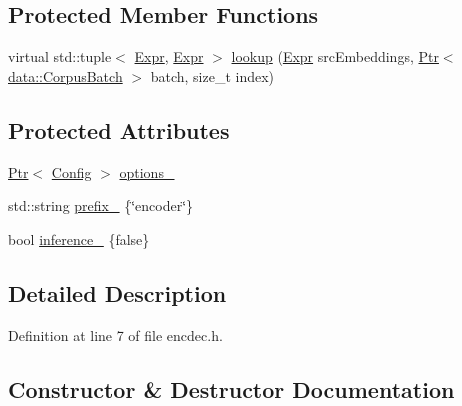 \subsection*{Protected Member Functions}
\begin{DoxyCompactItemize}
\item 
virtual std\+::tuple$<$ \hyperlink{namespacemarian_a498d8baf75b754011078b890b39c8e12}{Expr}, \hyperlink{namespacemarian_a498d8baf75b754011078b890b39c8e12}{Expr} $>$ \hyperlink{classmarian_1_1EncoderBase_a02e1594dfe8b093081c24f1aea1a35d6}{lookup} (\hyperlink{namespacemarian_a498d8baf75b754011078b890b39c8e12}{Expr} src\+Embeddings, \hyperlink{namespacemarian_ad1a373be43a00ef9ce35666145137b08}{Ptr}$<$ \hyperlink{classmarian_1_1data_1_1CorpusBatch}{data\+::\+Corpus\+Batch} $>$ batch, size\+\_\+t index)
\end{DoxyCompactItemize}
\subsection*{Protected Attributes}
\begin{DoxyCompactItemize}
\item 
\hyperlink{namespacemarian_ad1a373be43a00ef9ce35666145137b08}{Ptr}$<$ \hyperlink{classmarian_1_1Config}{Config} $>$ \hyperlink{classmarian_1_1EncoderBase_a42fa90e65cd49dacccae154bf7873d97}{options\+\_\+}
\item 
std\+::string \hyperlink{classmarian_1_1EncoderBase_abbd764c19ebaae1d6e4ffec0c9930fba}{prefix\+\_\+} \{\char`\"{}encoder\char`\"{}\}
\item 
bool \hyperlink{classmarian_1_1EncoderBase_a3543e255f5547f556c6ba30220ee2f2c}{inference\+\_\+} \{false\}
\end{DoxyCompactItemize}


\subsection{Detailed Description}


Definition at line 7 of file encdec.\+h.



\subsection{Constructor \& Destructor Documentation}
